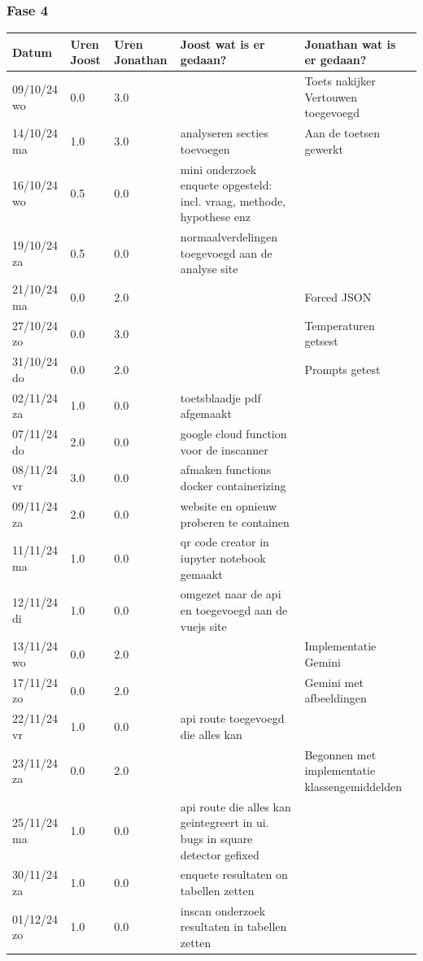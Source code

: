 \documentclass[12pt]{article}
\begin{document}
\subsubsection*{Fase 4}
\footnotesize
\begin{longtable}{@{}p{2.5cm} p{1cm} p{1.5cm} p{5cm} p{5cm}}
Datum  & Uren Joost & Uren Jonathan & Joost wat is er gedaan? & Jonathan wat is er gedaan? \\
\midrule
\endhead
09/10/24 wo & 0.0 & 3.0 &  & Toets nakijker Vertouwen toegevoegd  \\
14/10/24 ma & 1.0 & 3.0 & analyseren secties toevoegen & Aan de toetsen gewerkt \\
16/10/24 wo & 0.5 & 0.0 & mini onderzoek enquete opgesteld: incl. vraag, methode, hypothese enz &  \\
19/10/24 za & 0.5 & 0.0 & normaalverdelingen toegevoegd aan de analyse site &  \\
21/10/24 ma & 0.0 & 2.0 &  & Forced JSON \\
27/10/24 zo & 0.0 & 3.0 &  & Temperaturen getsest \\
31/10/24 do & 0.0 & 2.0 &  & Prompts getest \\
02/11/24 za & 1.0 & 0.0 & toetsblaadje pdf afgemaakt &  \\
07/11/24 do & 2.0 & 0.0 & google cloud function voor de inscanner &  \\
08/11/24 vr & 3.0 & 0.0 & afmaken functions docker containerizing &  \\
09/11/24 za & 2.0 & 0.0 & website en opnieuw proberen te containen &  \\
11/11/24 ma & 1.0 & 0.0 & qr code creator in iupyter notebook gemaakt &  \\
12/11/24 di & 1.0 & 0.0 & omgezet naar de api en toegevoegd aan de vuejs site &  \\
13/11/24 wo & 0.0 & 2.0 &  & Implementatie Gemini \\
17/11/24 zo & 0.0 & 2.0 &  & Gemini met afbeeldingen \\
22/11/24 vr & 1.0 & 0.0 & api route toegevoegd die alles kan &  \\
23/11/24 za & 0.0 & 2.0 &  & Begonnen met implementatie klassengemiddelden \\
25/11/24 ma & 1.0 & 0.0 & api route die alles kan geintegreert in ui. bugs in square detector gefixed &  \\
30/11/24 za & 1.0 & 0.0 & enquete resultaten on tabellen zetten &  \\
01/12/24 zo & 1.0 & 0.0 & inscan onderzoek resultaten in tabellen zetten &  \\

\end{longtable}
\end{document}
